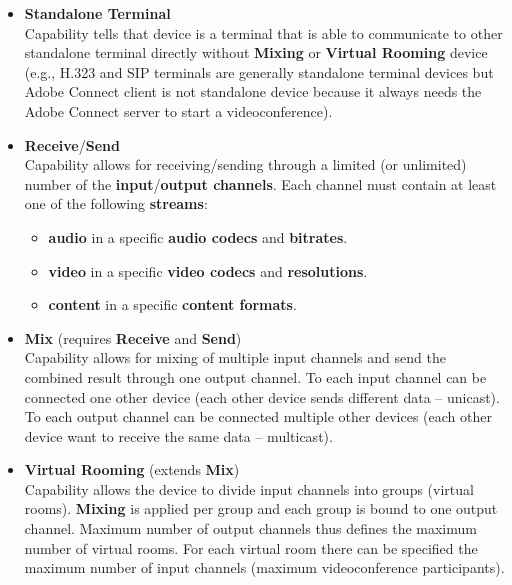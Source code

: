 \begin{itemize}
\newcommand{\RequireCapability}[1]{(requires #1)}
\newcommand{\ExtendCapability}[1]{(extends #1)}

\item \textbf{Standalone Terminal} \\
  Capability tells that device is a terminal that is able to communicate to
  other standalone terminal directly without \textbf{Mixing} or 
  \textbf{Virtual 
  Rooming} device (e.g., H.323 and SIP terminals are generally standalone 
  terminal devices but Adobe Connect client is not standalone device because 
  it always needs the Adobe Connect server to start a videoconference).
  
\item \textbf{Receive}/\textbf{Send} \\
  Capability allows for receiving/sending through a limited (or unlimited) 
  number of the \textbf{input}/\textbf{output channels}. Each channel must 
  contain at least one of the following \textbf{streams}:
  \begin{itemize}
    \item \textbf{audio} in a specific \textbf{audio codecs} and 
      \textbf{bitrates}.
    \item \textbf{video} in a specific \textbf{video codecs} and 
      \textbf{resolutions}.
    \item \textbf{content} in a specific \textbf{content formats}.
  \end{itemize} 
  
\item \textbf{Mix} \RequireCapability{\textbf{Receive} and \textbf{Send}} \\
  Capability allows for mixing of multiple input channels and send 
  the combined result through one output channel. To each input channel can be 
  connected one other device (each other device sends different data -- 
  unicast). To each output channel can be connected multiple other devices 
  (each other device want to receive the same data -- multicast).

\item \textbf{Virtual Rooming} \ExtendCapability{\textbf{Mix}} \\
  Capability allows the device to divide input channels into groups (virtual 
  rooms). \textbf{Mixing} is applied per group and each group 
  is bound to one output channel. Maximum number of output channels thus 
  defines the maximum number of virtual rooms. For each virtual room there can 
  be specified the maximum number of input channels (maximum videoconference 
  participants).


\end{itemize}
